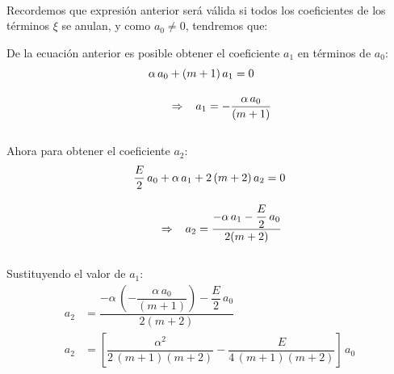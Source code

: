 \\
Recordemos que expresión anterior será válida si todos los coeficientes de los términos $\xi$ se anulan, y como $a_{0} \neq 0$, tendremos que:
\par
De la ecuación anterior es posible obtener el coeficiente $a_{1}$ en términos de $a_{0}$:
\begin{align*}
\alpha \, a_{0} &+ (m + 1) \, a_{1} = 0 \\[1em]
&\Rightarrow \hspace{0.3cm} a_{1} = - \dfrac{\alpha \, a_{0}}{(m + 1)}
\end{align*}
\\
Ahora para obtener el coeficiente $a_{2}$:
\begin{align*}
\dfrac{E}{2} \, a_{0} &+ \alpha \, a_{1} + 2 \, (m + 2) \, a_{2} = 0 \\[1em]
&\Rightarrow \hspace{0.3cm} a_{2} =  \dfrac{- \alpha \, a_{1} - \dfrac{E}{2} \, a_{0}}{2(m + 2)}
\end{align*}
\\
Sustituyendo el valor de $a_{1}$:
\begin{align*}
a_{2} &=  \dfrac{- \alpha \, \left( - \dfrac{\alpha \, a_{0}}{(m + 1)} \right) - \dfrac{E}{2} \, a_{0}}{2(m + 2)} \\[1em]
a_{2} &=  \left[ \dfrac{\alpha^{2}}{2 \, (m + 1)(m + 2)} - \dfrac{E}{4 \, (m + 1)(m + 2)} \right] \, a_{0}
\end{align*}
